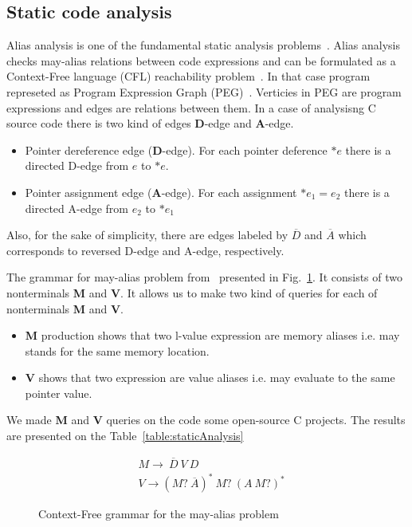 \subsection{Static code analysis}

Alias analysis is one of the fundamental static analysis problems~\cite{Marlowe}.
Alias analysis checks may-alias relations between code expressions and can be formulated as a Context-Free language (CFL) reachability problem~\cite{Reps}.
In that case program represeted as Program Expression Graph (PEG)~\cite{Zheng}.
Verticies in PEG are program expressions and edges are relations between them.
In a case of analysisng C source code there is two kind of edges \textbf{D}-edge and \textbf{A}-edge.

\begin{itemize}
    \item Pointer dereference edge (\textbf{D}-edge). For each pointer deference $*e$ there is a directed D-edge from $e$ to $*e$.
    \item Pointer assignment edge (\textbf{A}-edge). For each assignment $*e_1=e_2$ there is a directed A-edge from $e_2$ to $*e_1$
\end{itemize}

Also, for the sake of simplicity, there are edges labeled by $\overline{D}$ and $\overline{A}$ which corresponds to reversed D-edge and A-edge, respectively.

The grammar for may-alias problem from~\cite{Zheng} presented in Fig.~\ref{lst:aliasGrammar}.
It consists of two nonterminals \textbf{M} and \textbf{V}.
It allows us to make two kind of queries for each of nonterminals \textbf{M} and \textbf{V}.

\begin{itemize}
    \item \textbf{M} production shows that two l-value expression are memory aliases i.e. may stands for the same memory location.
    \item \textbf{V} shows that two expression are value aliases i.e. may evaluate to the same pointer value.
\end{itemize}

We made \textbf{M} and \textbf{V} queries on the code some open-source C projects.
The results are presented on the Table~\ref{table:staticAnalysis} 

\begin{figure}[t]
\begin{align*}
& M \rightarrow\ \overline{D}\ V\ D\\
& V \rightarrow (M ?\ \overline{A})^{*} \ M?\ (A\ M?)^{*}
\end{align*}
\caption{Context-Free grammar for the may-alias problem}
\label{lst:aliasGrammar}
\end{figure}

